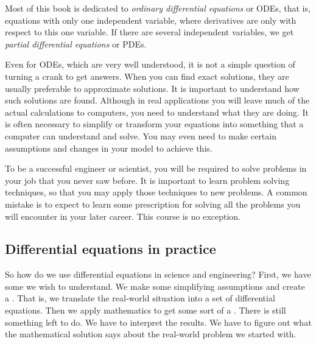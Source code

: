 Most of this book is dedicated to
\emph{ordinary differential equations}
or ODEs, that is, equations with
only one independent variable, where derivatives are only with respect to
this one variable.
If there are several independent variables, we get
\emph{partial differential equations}
or PDEs.

Even for ODEs, which are very well understood, it is not a simple question
of turning a crank to get answers.  
When you can find exact solutions, they are usually preferable to 
approximate solutions.  It is important to understand how
such solutions are found.
Although in real applications you will
leave much of the actual calculations to computers, you
need to understand what they are doing.  It is often necessary
to simplify or transform your equations into something that a computer can
understand and solve.
You may even need to make certain assumptions and changes in your
model to achieve this.

To be a successful engineer or scientist, you will be required to solve
problems in your job that you never saw before.  It is important to
learn problem solving techniques, so that you may apply those techniques to
new problems.  A common mistake is to expect to learn some prescription for
solving all the problems you will encounter in your later career.  This
course is no exception.

\subsection{Differential equations in practice}

\begin{mywrapfigsimp}{3.05in}{3.35in}
\noindent
{}
\diffypdfversion{\par\vspace*{5pt}}
\end{mywrapfigsimp}
So how do we use differential equations in science and engineering?  
First, we have some \emph{} we wish
to understand.
We make some simplifying assumptions and create a
\emph{}.
That is, we translate the real-world situation into a
set of differential equations.
Then we apply mathematics to get some sort of a
\emph{}.
There is still something left to do.  We have to interpret the results.
We have to figure out what the mathematical solution says about the real-world
problem we started with.

